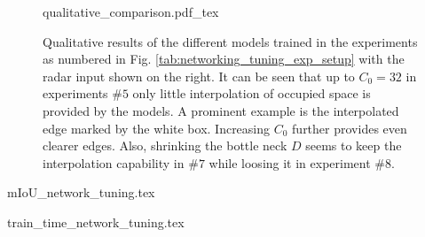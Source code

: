 \begin{figure}[H]
	\begin{center}
		{qualitative_comparison.pdf_tex}
		\caption{\label{fig:gt_exp_qual_results}Qualitative results of the different models trained in the experiments as numbered in Fig. \ref{tab:networking_tuning_exp_setup} with the radar input shown on the right. It can be seen that up to $C_0=32$ in experiments $\#5$ only little interpolation of occupied space is provided by the models. A prominent example is the interpolated edge marked by the white box. Increasing $C_0$ further provides even clearer edges. Also, shrinking the bottle neck $D$ seems to keep the interpolation capability in $\#7$ while loosing it in experiment $\#8$.}
	\end{center}
\end{figure}
\begin{center}
\begin{minipage}{.5\textwidth}
	{mIoU_network_tuning.tex}
\end{minipage}
%
\hfill
\begin{minipage}{.47\textwidth}
	{train_time_network_tuning.tex} 
\end{minipage}
\end{center}
%

